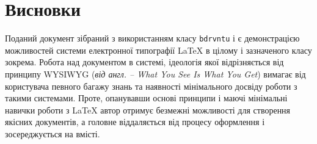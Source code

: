 \chapter*{Висновки}

Поданий документ зібраний з використанням класу \verb|bdrvntu| і є демонстрацією можливостей системи електронної типографії
{\LaTeX} в цілому і зазначеного класу зокрема. Робота над документом в системі, ідеологія якої відрізняється від принципу
WYSIWYG (\textit{від англ. -- What You See Is What You Get}) вимагає від користувача певного багажу знань та наявності
мінімального досвіду роботи з такими системами. Проте, опанувавши основі принципи і маючі мінімальні навички роботи з {\LaTeX}
автор отримує безмежні можливості для створення якісних документів, а головне віддаляється від процесу оформлення і 
зосереджується на вмісті. 